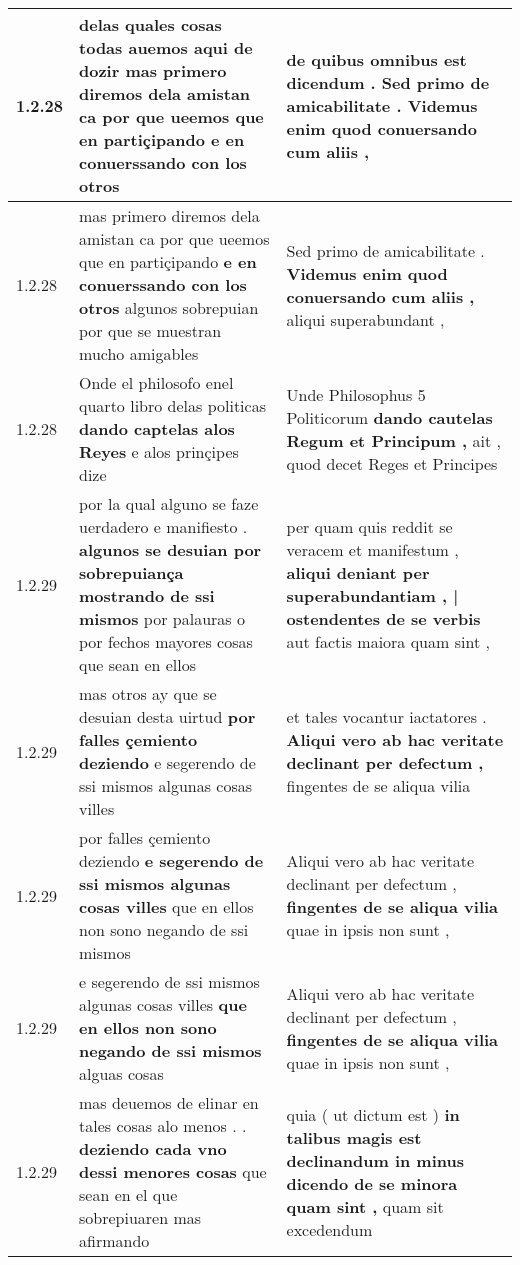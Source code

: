 \begin{tabular}{|p{1cm}|p{6.5cm}|p{6.5cm}|}
1.2.28 & delas quales cosas todas auemos aqui de dozir \textbf{ mas primero diremos dela amistan ca por que ueemos que en partiçipando } e en conuerssando con los otros & de quibus omnibus est dicendum . \textbf{ Sed primo de amicabilitate . } Videmus enim quod conuersando cum aliis , \\\hline
1.2.28 & mas primero diremos dela amistan ca por que ueemos que en partiçipando \textbf{ e en conuerssando con los otros } algunos sobrepuian por que se muestran mucho amigables & Sed primo de amicabilitate . \textbf{ Videmus enim quod conuersando cum aliis , } aliqui superabundant , \\\hline
1.2.28 & Onde el philosofo enel quarto libro delas politicas \textbf{ dando captelas alos Reyes } e alos prinçipes dize & Unde Philosophus 5 Politicorum \textbf{ dando cautelas Regum et Principum , } ait , quod decet Reges et Principes \\\hline
1.2.29 & por la qual alguno se faze uerdadero e manifiesto . \textbf{ algunos se desuian por sobrepuiança mostrando de ssi mismos } por palauras o por fechos mayores cosas que sean en ellos & per quam quis reddit se veracem et manifestum , \textbf{ aliqui deniant per superabundantiam , | ostendentes de se verbis } aut factis maiora quam sint , \\\hline
1.2.29 & mas otros ay que se desuian desta uirtud \textbf{ por falles çemiento deziendo } e segerendo de ssi mismos algunas cosas villes & et tales vocantur iactatores . \textbf{ Aliqui vero ab hac veritate declinant per defectum , } fingentes de se aliqua vilia \\\hline
1.2.29 & por falles çemiento deziendo \textbf{ e segerendo de ssi mismos algunas cosas villes } que en ellos non sono negando de ssi mismos & Aliqui vero ab hac veritate declinant per defectum , \textbf{ fingentes de se aliqua vilia } quae in ipsis non sunt , \\\hline
1.2.29 & e segerendo de ssi mismos algunas cosas villes \textbf{ que en ellos non sono negando de ssi mismos } alguas cosas & Aliqui vero ab hac veritate declinant per defectum , \textbf{ fingentes de se aliqua vilia } quae in ipsis non sunt , \\\hline
1.2.29 & mas deuemos de elinar en tales cosas alo menos . . \textbf{ deziendo cada vno dessi menores cosas } que sean en el que sobrepiuaren mas afirmando & quia ( ut dictum est ) \textbf{ in talibus magis est declinandum in minus dicendo de se minora quam sint , } quam sit excedendum \\\hline

\end{tabular}

